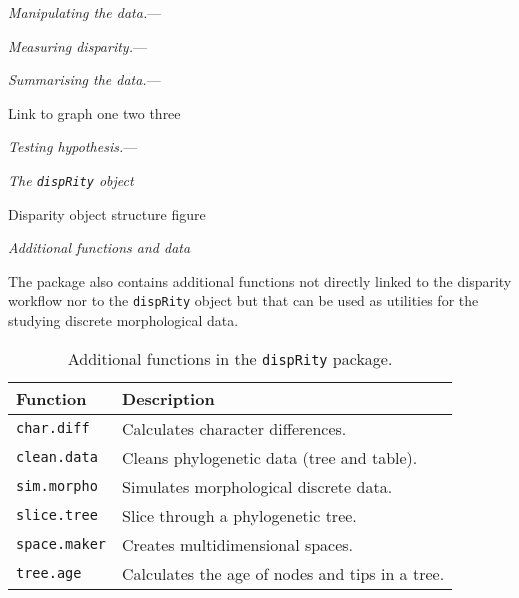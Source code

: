 \documentclass[12pt,letterpaper]{article}
\renewcommand{\subsection}[1]{%
\bigskip
\begin{center}
\begin{large}
\normalfont\itshape #1
\end{large}
\end{center}}
\renewcommand{\subsubsection}[1]{%
\vspace{2ex}
\noindent
\textit{#1.}---}
\begin{document}
\subsubsection{Manipulating the data}

\subsubsection{Measuring disparity}

\subsubsection{Summarising the data}

Link to graph one two three

\subsubsection{Testing hypothesis}

\subsection{The \texttt{dispRity} object}

Disparity object structure figure

\subsection{Additional functions and data}

The package also contains additional functions not directly linked to the disparity workflow nor to the \texttt{dispRity} object but that can be used as utilities for the studying discrete morphological data.

\begin{table}
    \begin{tabular}{ll}
        \hline
        Function & Description \\ 
        \hline
        \texttt{char.diff} & Calculates character differences. \\
        \texttt{clean.data} & Cleans phylogenetic data (tree and table). \\
        \texttt{sim.morpho} & Simulates morphological discrete data. \\
        \texttt{slice.tree} & Slice through a phylogenetic tree. \\
        \texttt{space.maker} & Creates multidimensional spaces. \\
        \texttt{tree.age} & Calculates the age of nodes and tips in a tree. \\
        \hline
    \end{tabular}
    \caption{Additional functions in the \texttt{dispRity} package.}
\end{table}
\end{document}

